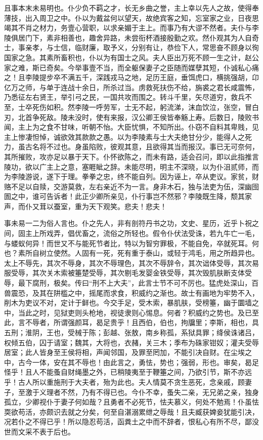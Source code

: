 \documentclass[12pt,UTF8]{ctexbook}
\begin{document}
且事本末未易明也。仆少负不羁之才，长无乡曲之誉，主上幸以先人之故，使得奉薄技，出入周卫之中。仆以为戴盆何以望天，故绝宾客之知，忘室家之业，日夜思竭其不肖之材力，务壹心营职，以求亲媚于主上。而事乃有大谬不然者。夫仆与李陵俱居门下，素非相善也，趣舍异路，未尝衔杯酒接殷勤之欢。然仆观其为人自奇士，事亲孝，与士信，临财廉，取予义，分别有让，恭俭下人，常思奋不顾身以徇国家之急。其素所畜积也，仆以为有国士之风。夫人臣出万死不顾一生之计，赵公家之难，斯已奇矣。今举事壹不当，而全躯保妻子之臣随而媒孽其短，仆诚私心痛之！且李陵提步卒不满五千，深践戎马之地，足历王庭，垂饵虎口，横挑强胡，卬亿万之师，与单于连战十余日，所杀过当。虏救死扶伤不给，旃裘之君长咸震怖，乃悉征左右贤王，举引弓之民，一国共攻而围之。转斗千里，矢尽道穷，救兵不至，士卒死伤如积。然李陵一呼劳军，士无不起，躬流涕，沫血饮泣，张空，冒白刃，北首争死敌。陵未没时，使有来报，汉公卿王侯皆奉觞上寿。后数日，陵败书闻，主上为之食不甘味，听朝不怡。大臣忧惧，不知所出。仆窃不自料其卑贱，见主上惨凄怛悼，诚欲效其款款之愚。以为李陵素与士大夫绝甘分少，能得人之死力，虽古名将不过也。身虽陷败，彼观其意，且欲得其当而报汉。事已无可奈何，其所摧败，攻亦足以暴于天下。仆怀欲陈之，而未有路，适会召问，即以此指推言陵功，欲以广主上之意，塞睚眦之辞。未能尽明，明主不深晓，以为仆沮贰师，而为李陵游说，遂下于理。拳拳之忠，终不能自列。因为诬上，卒从吏议。家贫，财赂不足以自赎，交游莫救，左右亲近不为一言。身非木石，独与法吏为伍，深幽囹圄之中，谁可告诉者！此正少卿所亲见，仆行事岂不然邪？李陵既生降，颓其家声，而仆又茸以蚕室，重为天下观笑。悲夫！悲夫！



事未易一二为俗人言也。仆之先人，非有剖符丹书之功，文史、星历，近乎卜祝之间，固主上所戏弄，倡优畜之，流俗之所轻也。假令仆伏法受诛，若九牛亡一毛，与蝼蚁何异！而世又不与能死节者比，特以为智穷罪极，不能自免，卒就死耳。何也？素所自树立使然。人固有一死，死有重于泰山，或轻于鸿毛，用之所趋异也。太上不辱先，其次不辱身，其次不辱理色，其次不辱辞令，其次诎体受辱，其次易服受辱，其次关木索被箠楚受辱，其次剔毛发婴金铁受辱，其次毁肌肤断支体受辱，最下腐刑，极矣。传曰“刑不上大夫”，此言士节不可不厉也。猛虎处深山，百兽震恐，及其在阱槛之中，摇尾而求食，积威约之渐也。故士有画地为牢势不入，削木为吏议不对，定计于鲜也。今交手足，受木索，暴肌肤，受榜箠，幽于圜墙之中，当此之时，见狱吏则头枪地，视徒隶则心惕息。何者？积威约之势也。及已至此，言不辱者，所谓强颜耳，曷足贵乎！且西伯，伯也，拘牖里；李斯，相也，具五刑；淮阴，王也，受械于陈；彭越、张敖，南乡称孤，系狱具罪；绛侯诛诸吕，权倾五伯，囚于请室；魏其，大将也，衣赭，关三木；季布为硃家钳奴；灌夫受辱居室；此人皆身至王侯将相，声闻邻国，及罪至罔加，不能引决自财。在尘埃之中，古今一体，安在其不辱也！由此言之，勇怯，势也；强弱，形也。审矣，曷足怪乎！且人不能蚤自财绳墨之外，已稍陵夷至于鞭箠之间，乃欲引节，斯不亦远乎！古人所以重施刑于大夫者，殆为此也。夫人情莫不贪生恶死，念亲戚，顾妻子，至激于义理者不然，乃有不得已也。今仆不幸，蚤失二亲，无兄弟之亲，独身孤立，少卿视仆于妻子何如哉？且勇者不必死节，怯夫慕义，何处不勉焉！仆虽怯耎欲苟活，亦颇识去就之分矣，何至自湛溺累绁之辱哉！且夫臧获婢妾犹能引决，况若仆之不得已乎！所以隐忍苟活，函粪土之中而不辞者，恨私心有所不尽，鄙没世而文采不表于后也。
\end{document}
